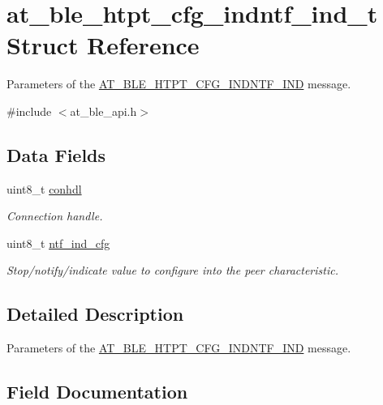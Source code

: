 \hypertarget{structat__ble__htpt__cfg__indntf__ind__t}{}\section{at\+\_\+ble\+\_\+htpt\+\_\+cfg\+\_\+indntf\+\_\+ind\+\_\+t Struct Reference}
\label{structat__ble__htpt__cfg__indntf__ind__t}


Parameters of the \mbox{\hyperlink{at__ble__api_8h_a3324640b95f33169515f89738ed5baeba0e77ddce57b6c3056113721b42605dfb}{A\+T\+\_\+\+B\+L\+E\+\_\+\+H\+T\+P\+T\+\_\+\+C\+F\+G\+\_\+\+I\+N\+D\+N\+T\+F\+\_\+\+I\+ND}} message.  




{\ttfamily \#include $<$at\+\_\+ble\+\_\+api.\+h$>$}

\subsection*{Data Fields}
\begin{DoxyCompactItemize}
\item 
uint8\+\_\+t \mbox{\hyperlink{structat__ble__htpt__cfg__indntf__ind__t_a92cddd82111862a20ab6ed3a6a7f9ea2}{conhdl}}
\begin{DoxyCompactList}\small\item\em Connection handle. \end{DoxyCompactList}\item 
uint8\+\_\+t \mbox{\hyperlink{structat__ble__htpt__cfg__indntf__ind__t_a3af49eea3acf55ffcec221564edf2077}{ntf\+\_\+ind\+\_\+cfg}}
\begin{DoxyCompactList}\small\item\em Stop/notify/indicate value to configure into the peer characteristic. \end{DoxyCompactList}\end{DoxyCompactItemize}


\subsection{Detailed Description}
Parameters of the \mbox{\hyperlink{at__ble__api_8h_a3324640b95f33169515f89738ed5baeba0e77ddce57b6c3056113721b42605dfb}{A\+T\+\_\+\+B\+L\+E\+\_\+\+H\+T\+P\+T\+\_\+\+C\+F\+G\+\_\+\+I\+N\+D\+N\+T\+F\+\_\+\+I\+ND}} message. 

\subsection{Field Documentation}
\mbox{\label{structat__ble__htpt__cfg__indntf__ind__t_a92cddd82111862a20ab6ed3a6a7f9ea2}} 
